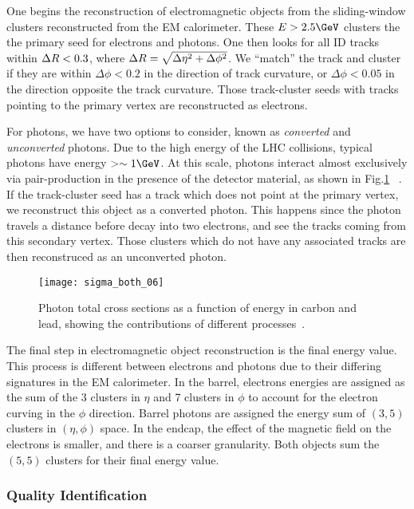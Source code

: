 One begins the reconstruction of electromagnetic objects from the sliding-window clusters reconstructed from the EM calorimeter.
These $E > 2.5 \GeV$ clusters the the primary seed for electrons and photons.
One then looks for all ID tracks within $\Delta R < 0.3$, where $\Delta R = \sqrt{\Delta\eta^2 + \Delta\phi^2}$.
We ``match'' the track and cluster if they are within $\Delta \phi < 0.2$ in the direction of track curvature, or $\Delta \phi < 0.05$ in the direction opposite the track curvature.
Those track-cluster seeds with tracks pointing to the primary vertex are reconstructed as electrons.

For photons, we have two options to consider, known as \textit{converted} and \textit{unconverted} photons.
Due to the high energy of the LHC collisions, typical photons have energy $ >\order 1 \GeV$.
At this scale, photons interact almost exclusively via pair-production in the presence of the detector material, as shown in Fig.\ref{fig:photon_pair_production} ~\cite{Agashe:2014kda}.
If the track-cluster seed has a track which does not point at the primary vertex, we reconstruct this object as a converted photon.
This happens since the photon travels a distance before decay into two electrons, and see the tracks coming from this secondary vertex.
Those clusters which do not have any associated tracks are then reconstruced as an unconverted photon.
\begin{figure}
\caption{Photon total cross sections as a function of energy in carbon and lead, showing the contributions of different processes~\cite{Agashe:2014kda}.} \label{fig:photon_pair_production}
\texttt{[image: sigma\_both\_06]}
\end{figure}

The final step in electromagnetic object reconstruction is the final energy value.
This process is different between electrons and photons due to their differing signatures in the EM calorimeter.
In the barrel, electrons energies are assigned as the sum of the 3 clusters in $\eta$ and 7 clusters in $\phi$ to account for the electron curving in the $\phi$ direction.
Barrel photons are assigned the energy sum of $(3,5)$ clusters in $(\eta, \phi)$ space.
In the endcap, the effect of the magnetic field on the electrons is smaller, and there is a coarser granularity.
Both objects sum the $(5,5)$ clusters for their final energy value.

\subsubsection{Quality Identification}

